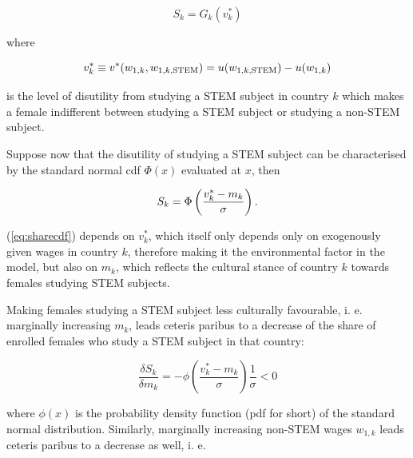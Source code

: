 \documentclass[a4paper, oneside, hyperfootnotes = false]{article}
\begin{document}
{\begin{equation}
	\label{eq:share}
	S_{k} = G_{k}(v^{*}_{k})
\end{equation}

\noindent where

\vspace{-8mm}

\begin{equation*}
	\label{eq:indiff}
	v^{*}_{k} \equiv v^{*}(w_{1,k}, w_{1,k,\textnormal{STEM}}) = u(w_{1,k,\textnormal{STEM}}) - u(w_{1,k})
\end{equation*}

\noindent is the level of disutility from studying a STEM subject in country $k$ which makes a female indifferent between studying a STEM subject or studying a non-STEM subject.

Suppose now that the disutility of studying a STEM subject can be characterised by the standard normal cdf $\Phi{}(x)$ evaluated at $x$, then

\vspace{-8mm}

\begin{equation}
	\label{eq:sharecdf}
	S_{k} = \Phi\left(\frac{v^{*}_{k} - m_{k}}{\sigma}\right)\textnormal{.}
\end{equation}

\noindent (\ref{eq:sharecdf}) depends on $v^{*}_{k}$, which itself only depends only on exogenously given wages in country $k$, therefore making it the environmental factor in the model, but also on $m_{k}$, which reflects the cultural stance of country $k$ towards females studying STEM subjects.

Making females studying a STEM subject less culturally favourable, i. e. marginally increasing $m_{k}$, leads ceteris paribus to a decrease of the share of enrolled females who study a STEM subject in that country:

\vspace{-8mm}

\begin{equation*}
	\label{eq:derivmk}
	\frac{\delta{}S_{k}}{\delta{}m_{k}} = -\phi\left(\frac{v^{*}_{k} - m_{k}}{\sigma}\right)\frac{1}{\sigma} < 0
\end{equation*}

\noindent where $\phi(x)$ is the probability density function (pdf for short) of the standard normal distribution. Similarly, marginally increasing non-STEM wages $w_{1,k}$ leads ceteris paribus to a decrease as well, i. e.

}
\end{document}
